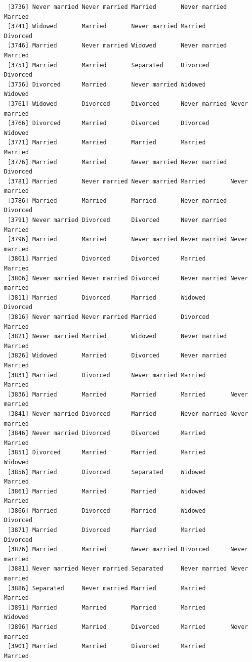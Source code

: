 \documentclass[
  letterpaper,
  DIV=11,
  numbers=noendperiod,
  oneside]{scrartcl}
\begin{document}
\begin{verbatim}
 [3736] Never married Never married Married       Never married Married      
 [3741] Widowed       Married       Never married Married       Divorced     
 [3746] Married       Never married Widowed       Never married Married      
 [3751] Married       Married       Separated     Divorced      Divorced     
 [3756] Divorced      Married       Never married Widowed       Widowed      
 [3761] Widowed       Divorced      Divorced      Never married Never married
 [3766] Divorced      Married       Divorced      Divorced      Widowed      
 [3771] Married       Married       Married       Married       Married      
 [3776] Married       Married       Never married Never married Divorced     
 [3781] Married       Never married Never married Married       Never married
 [3786] Married       Married       Married       Never married Divorced     
 [3791] Never married Divorced      Divorced      Never married Married      
 [3796] Married       Married       Never married Never married Never married
 [3801] Married       Divorced      Divorced      Married       Married      
 [3806] Never married Never married Divorced      Never married Never married
 [3811] Married       Divorced      Married       Widowed       Divorced     
 [3816] Never married Never married Married       Divorced      Married      
 [3821] Never married Married       Widowed       Never married Married      
 [3826] Widowed       Married       Divorced      Never married Married      
 [3831] Married       Divorced      Never married Married       Married      
 [3836] Married       Married       Married       Married       Never married
 [3841] Never married Divorced      Married       Never married Never married
 [3846] Never married Divorced      Divorced      Married       Married      
 [3851] Divorced      Married       Married       Married       Widowed      
 [3856] Married       Divorced      Separated     Widowed       Married      
 [3861] Married       Married       Married       Widowed       Married      
 [3866] Married       Divorced      Married       Widowed       Divorced     
 [3871] Married       Divorced      Married       Married       Divorced     
 [3876] Married       Married       Never married Divorced      Never married
 [3881] Never married Never married Separated     Never married Never married
 [3886] Separated     Never married Married       Married       Married      
 [3891] Married       Married       Married       Married       Widowed      
 [3896] Married       Married       Divorced      Married       Never married
 [3901] Married       Married       Divorced      Married       Married      

\end{verbatim}
\end{document}
